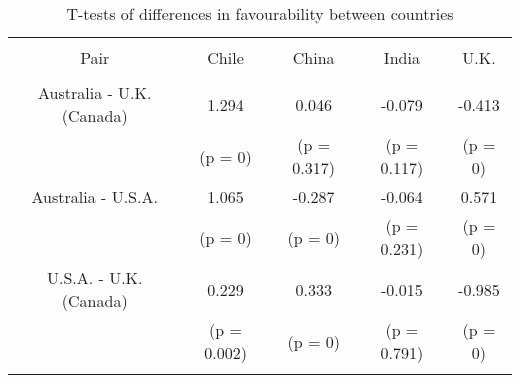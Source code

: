 
\begin{table}[!htbp] \centering 
  \caption{T-tests of differences in favourability between countries} 
  \label{tab:ttests} 
\begin{tabular}{@{\extracolsep{5pt}} ccccc} 
\\[-1.8ex]\hline 
\hline \\[-1.8ex] 
Pair & Chile & China & India & U.K. \\ 
\hline \\[-1.8ex] 
Australia - U.K. (Canada) & 1.294 & 0.046 & -0.079 & -0.413 \\ 
 & (p = 0) & (p = 0.317) & (p = 0.117) & (p = 0) \\ 
Australia - U.S.A. & 1.065 & -0.287 & -0.064 & 0.571 \\ 
 & (p = 0) & (p = 0) & (p = 0.231) & (p = 0) \\ 
U.S.A. - U.K. (Canada) & 0.229 & 0.333 & -0.015 & -0.985 \\ 
 & (p = 0.002) & (p = 0) & (p = 0.791) & (p = 0) \\ 
\hline \\[-1.8ex] 
\end{tabular} 
\end{table} 
